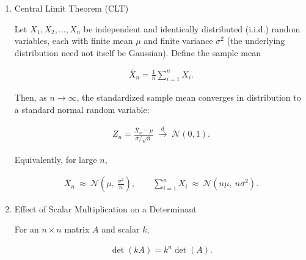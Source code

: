 \begin{enumerate}[label=\thesubsection.\arabic*,ref=\thesubsection.\theenumi]
\begin{enumerate}
    The probability mass function is approximated as:
    \begin{align}
    \pr{X = k} \approx \frac{1}{\sqrt{2\pi np(1-p)}} \exp\left( -\frac{(k - np)^2}{2np(1-p)} \right).
    \end{align}

    \item Continuity Correction
    When approximating a discrete binomial distribution using a continuous Gaussian distribution, a continuity correction factor of $0.5$ is applied:
    \begin{align}
    \pr{a \le X \le b} \approx P\left( \frac{a - 0.5 - np}{\sqrt{np(1-p)}} \le Z \le \frac{b + 0.5 - np}{\sqrt{np(1-p)}} \right).
    \end{align}

\end{enumerate}

\item Central Limit Theorem (CLT)

Let $X_1,X_2,\dots,X_n$ be independent and identically distributed
(i.i.d.) random variables, each with finite mean $\mu$ and finite
variance $\sigma^{2}$ (the underlying distribution need not itself be
Gaussian). Define the sample mean

\begin{align}
\bar{X}_n=\frac{1}{n}\sum_{i=1}^{n}X_i.
\end{align}

Then, as $n\to\infty$, the standardized sample mean converges in
distribution to a standard normal random variable:

\begin{align}
Z_n=\frac{\bar{X}_n-\mu}{\sigma/\sqrt{n}}
\;\xrightarrow{d}\;
\mathcal{N}(0,1).
\end{align}

Equivalently, for large $n$,

\begin{align}
\bar{X}_n\ \approx\ \mathcal{N}\!\left(\mu,\ \frac{\sigma^{2}}{n}\right),
\qquad
\sum_{i=1}^{n}X_i\ \approx\ \mathcal{N}\!\left(n\mu,\ n\sigma^{2}\right).
\end{align}


\item Effect of Scalar Multiplication on a Determinant

For an $n\times n$ matrix $A$ and scalar $k$,

\begin{align}
\det(kA)=k^{n}\det(A). \label{det}
\end{align}
\end{enumerate}
%
